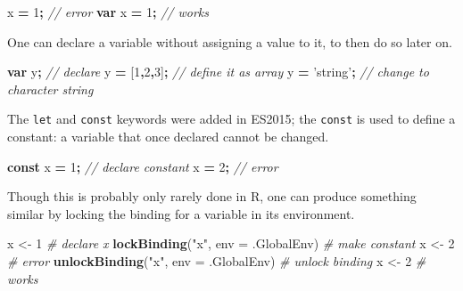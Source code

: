 \documentclass[10pt,]{krantz}
\makeatletter
\newenvironment{Shaded}{\begin{snugshade}}{\end{snugshade}}
\newcommand{\CommentTok}[1]{\textcolor[rgb]{0.37,0.37,0.37}{\textit{#1}}}
\newcommand{\DataTypeTok}[1]{\textcolor[rgb]{0.27,0.27,0.27}{#1}}
\newcommand{\DecValTok}[1]{\textcolor[rgb]{0.06,0.06,0.06}{#1}}
\newcommand{\KeywordTok}[1]{\textcolor[rgb]{0.27,0.27,0.27}{\textbf{#1}}}
\newcommand{\NormalTok}[1]{#1}
\newcommand{\OperatorTok}[1]{\textcolor[rgb]{0.43,0.43,0.43}{\textbf{#1}}}
\newcommand{\StringTok}[1]{\textcolor[rgb]{0.5,0.5,0.5}{#1}}
\newenvironment{kframe}{%
\medskip{}
\setlength{\fboxsep}{.8em}
 \def\at@end@of@kframe{}%
 \ifinner\ifhmode%
  \def\at@end@of@kframe{\end{minipage}}%
  \begin{minipage}{\columnwidth}%
 \fi\fi%
 \def\FrameCommand##1{\hskip\@totalleftmargin \hskip-\fboxsep
 \colorbox{shadecolor}{##1}\hskip-\fboxsep
     \hskip-\linewidth \hskip-\@totalleftmargin \hskip\columnwidth}%
 \MakeFramed {\advance\hsize-\width
   \@totalleftmargin\z@ \linewidth\hsize
   \@setminipage}}%
 {\par\unskip\endMakeFramed%
 \at@end@of@kframe}
\renewenvironment{Shaded}{\begin{kframe}}{\end{kframe}}
\makeatother
\begin{document}
\begin{Shaded}
\begin{Highlighting}[]
\NormalTok{x }\OperatorTok{=} \DecValTok{1}\OperatorTok{;} \CommentTok{// error}
\KeywordTok{var}\NormalTok{ x }\OperatorTok{=} \DecValTok{1}\OperatorTok{;} \CommentTok{// works}
\end{Highlighting}
\end{Shaded}

One can declare a variable without assigning a value to it, to then do so later on.

\begin{Shaded}
\begin{Highlighting}[]
\KeywordTok{var}\NormalTok{ y}\OperatorTok{;} \CommentTok{// declare }
\NormalTok{y }\OperatorTok{=}\NormalTok{ [}\DecValTok{1}\OperatorTok{,}\DecValTok{2}\OperatorTok{,}\DecValTok{3}\NormalTok{]}\OperatorTok{;} \CommentTok{// define it as array}
\NormalTok{y }\OperatorTok{=} \StringTok{'string'}\OperatorTok{;} \CommentTok{// change to character string}
\end{Highlighting}
\end{Shaded}

The \texttt{let} and \texttt{const} keywords were added in ES2015; the \texttt{const} is used to define a constant: a variable that once declared cannot be changed.

\begin{Shaded}
\begin{Highlighting}[]
\KeywordTok{const}\NormalTok{ x }\OperatorTok{=} \DecValTok{1}\OperatorTok{;} \CommentTok{// declare constant}
\NormalTok{x }\OperatorTok{=} \DecValTok{2}\OperatorTok{;} \CommentTok{// error}
\end{Highlighting}
\end{Shaded}

Though this is probably only rarely done in R, one can produce something similar by locking the binding for a variable in its environment.

\begin{Shaded}
\begin{Highlighting}[]
\NormalTok{x <-}\StringTok{ }\DecValTok{1} \CommentTok{# declare x}
\KeywordTok{lockBinding}\NormalTok{(}\StringTok{"x"}\NormalTok{, }\DataTypeTok{env =}\NormalTok{ .GlobalEnv) }\CommentTok{# make constant}
\NormalTok{x <-}\StringTok{ }\DecValTok{2} \CommentTok{# error}
\KeywordTok{unlockBinding}\NormalTok{(}\StringTok{"x"}\NormalTok{, }\DataTypeTok{env =}\NormalTok{ .GlobalEnv) }\CommentTok{# unlock binding}
\NormalTok{x <-}\StringTok{ }\DecValTok{2} \CommentTok{# works}
\end{Highlighting}
\end{Shaded}
\end{document}
